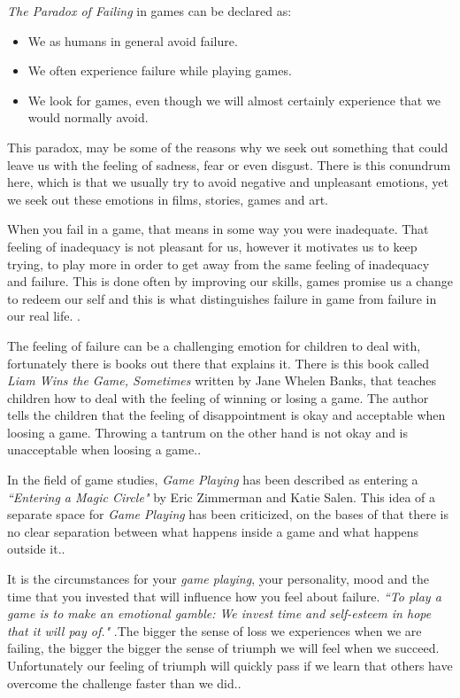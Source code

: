 \textit{The Paradox of Failing} in games can be declared as:
\begin{itemize}
    \item We as humans in general avoid failure.
    \item We often experience failure while playing games.
    \item We look for games, even though we will almost certainly experience that we would normally avoid. 
\end{itemize}

This paradox, may be some of the reasons why we seek out something that could leave us with the feeling of sadness, fear or even disgust. There is this conundrum here, which is that we usually try to avoid negative and unpleasant emotions, yet we seek out these emotions in films, stories, games and art.\cite[P.~2-4]{TheArtOfFailure}

When you fail in a game, that means in some way you were inadequate. That feeling of inadequacy is not pleasant for us, however it motivates us to keep trying, to play more in order to get away from the same feeling of inadequacy and failure. This is done often by improving our skills, games promise us a change to redeem our self and this is what distinguishes failure in game from failure in our real life.
\cite[P.~7]{TheArtOfFailure}.

The feeling of failure can be a challenging emotion for children to deal with, fortunately there is books out there that explains it. There is this book called \textit{Liam Wins the Game, Sometimes} written by Jane Whelen Banks, that teaches children how to deal with the feeling of winning or losing a game. The author tells the children that the feeling of disappointment is okay and acceptable when loosing a game. Throwing a tantrum on the other hand is not okay and is unacceptable when loosing a game.\cite[P.~8]{TheArtOfFailure}.

In the field of game studies, \textit{Game Playing} has been described as entering a \textit{``Entering a Magic Circle"} by Eric Zimmerman and Katie Salen. This idea of a separate space for \textit{Game Playing} has been criticized, on the bases of that there is no clear separation between what happens inside a game and what happens outside it.\cite[P.~13]{TheArtOfFailure}.

It is the circumstances for your \textit{game playing}, your personality, mood and the time that you invested that will influence how you feel about failure. \textit{``To play a game is to make an emotional gamble: We invest time and self-esteem in hope that it will pay of."} .The bigger the sense of loss we experiences when we are failing, the bigger the bigger the sense of triumph we will feel when we succeed. Unfortunately our feeling of triumph will quickly pass if we learn that others have overcome the challenge faster than we did.\cite[P.~13-14]{TheArtOfFailure}.

